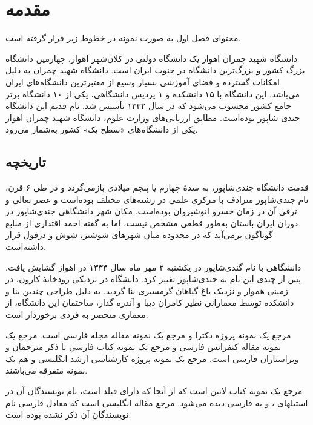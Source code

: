 
\chapter{مقدمه} \label{chapter:introduction}

محتوای فصل اول به صورت نمونه در خطوط زیر قرار گرفته است.

دانشگاه شهید چمران اهواز یک دانشگاه دولتی در کلان‌شهر اهواز، چهارمین دانشگاه بزرگ کشور و بزرگ‌ترین دانشگاه در جنوب ایران است. دانشگاه شهید چمران به دلیل امکانات گسترده و فضای آموزشی بسیار وسیع از معتبرترین دانشگاه‌های ایران می‌باشد. این دانشگاه با ۱۵ دانشکده و ۱ پردیس دانشگاهی، یکی از ۱۰ دانشگاه برتر جامع کشور محسوب می‌شود که در سال ۱۳۳۲ تأسیس شد. نام قدیم این دانشگاه جندی شاپور بوده‌است. مطابق ارزیابی‌های وزارت علوم، دانشگاه شهید چمران اهواز یکی از دانشگاه‌های «سطح یک» کشور به‌شمار می‌رود.
\section{تاریخچه}\label{sec:history}

قدمت دانشگاه جندی‌شاپور، به سدهٔ چهارم یا پنجم میلادی بازمی‌گردد و در طی ۶ قرن، نام جندی‌شاپور مترادف با مرکزی علمی در رشته‌های مختلف بوده‌است و عصر تعالی و ترقی آن در زمان خسرو انوشیروان بوده‌است. مکان شهر دانشگاهی جندی‌شاپور در دوران ایران باستان به‌طور قطعی مشخص نیست، اما به گفته احمد اقتداری از منابع گوناگون برمی‌آید که در محدوده میان شهرهای شوشتر، شوش و دزفول قرار داشته‌است.\cite{eghtedari00diyar}

دانشگاهی با نام گندی‌شاپور در یکشنبه ۲ مهر ماه سال ۱۳۳۴ در اهواز گشایش یافت. پس از چندی این نام به جندی‌شاپور تغییر کرد. دانشگاه در نزدیکی رودخانهٔ کارون، در زمینی هموار و نزدیک باغ گیاهان گرمسیری بنا گردید. به دلیل طراحی چندین بنا و دانشکده توسط معمارانی نظیر کامران دیبا و آندره گدار، ساختمان این دانشگاه، از معماری منحصر به فردی برخوردار است.

مرجع \cite{Omidali82phdThesis} یک نمونه پروژه دکترا و مرجع \cite{Vahedi87} یک نمونه مقاله مجله فارسی است.
مرجع \cite{Amintoosi87afzayesh}  یک نمونه  مقاله کنفرانس فارسی و
مرجع \cite{Pedram80osool} یک نمونه کتاب فارسی با ذکر مترجمان و ویراستاران فارسی است. مرجع \cite{Khalighi07MscThesis} یک نمونه پروژه کارشناسی ارشد انگلیسی و
\cite{Khalighi87xepersian} هم یک نمونه متفرقه  می‌باشند.

مرجع \cite{Gonzalez02book} یک نمونه کتاب لاتین است که از آنجا که دارای فیلد  است، نام نویسندگان آن در استیلهای ،  و  به فارسی دیده می‌شود. مرجع \cite{Baker02limits} مقاله انگلیسی است که معادل فارسی نام نویسندگان آن ذکر نشده بوده است.



